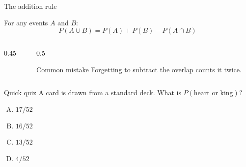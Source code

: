 \documentclass{beamer}
\begin{document}
\begin{frame}{The addition rule}
  \begin{theorem}
    For any events $A$ and $B$:
    \[ P(A \cup B) = P(A) + P(B) - P(A \cap B) \]
  \end{theorem}
  \begin{columns}[c]
    \begin{column}{0.45\textwidth}
      \centering
    \end{column}
    \begin{column}{0.5\textwidth}
      \begin{alertblock}{Common mistake}
        Forgetting to subtract the overlap counts it twice.
      \end{alertblock}
    \end{column}
  \end{columns}
\end{frame}

\begin{frame}{Quick quiz}
  A card is drawn from a standard deck. What is $P(\text{heart or king})$?
  \vspace{1em}
  \begin{enumerate}[A.]
    \item $17/52$
    \item<1-|alert@2> $16/52$
    \item $13/52$
    \item $4/52$
  \end{enumerate}
  \vspace{1em}
\end{frame}
\end{document}
